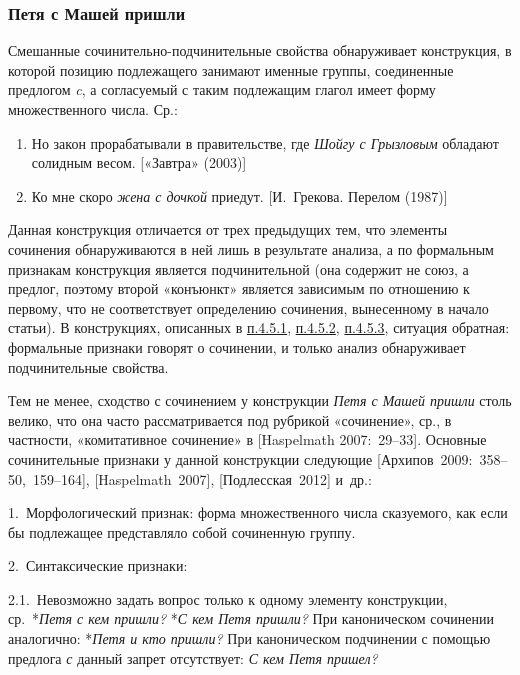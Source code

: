\subsubsection{Петя с Машей
пришли}\label{ux43fux435ux442ux44f-ux441-ux43cux430ux448ux435ux439-ux43fux440ux438ux448ux43bux438}

Смешанные сочинительно-подчинительные свойства обнаруживает конструкция,
в которой позицию подлежащего занимают именные группы, соединенные
предлогом \textit{c}, а согласуемый с таким подлежащим глагол имеет форму
множественного числа. Ср.:

\begin{enumerate}
\def\labelenumi{(\arabic{enumi})}
\setcounter{enumi}{62}
\item
  Но закон прорабатывали в правительстве, где \textit{Шойгу с Грызловым}
  обладают солидным весом. {[}«Завтра» (2003){]}
\item
  Ко мне скоро \textit{жена с дочкой} приедут. {[}И.~Грекова. Перелом
  (1987){]}
\end{enumerate}

Данная конструкция отличается от трех предыдущих тем, что элементы
сочинения обнаруживаются в ней лишь в результате анализа, а по
формальным признакам конструкция является подчинительной (она содержит
не союз, а предлог, поэтому второй «конъюнкт» является зависимым по
отношению к первому, что не соответствует определению сочинения,
вынесенному в начало статьи). В конструкциях, описанных в
\underline{п.4.5.1}, \underline{п.4.5.2}, \underline{п.4.5.3}, ситуация
обратная: формальные признаки говорят о сочинении, и только анализ
обнаруживает подчинительные свойства.

Тем не менее, сходство с сочинением у конструкции \textit{Петя с Машей
пришли} столь велико, что она часто рассматривается под рубрикой
«сочинение», ср., в частности, «комитативное сочинение» в {[}Haspelmath
2007:~29--33{]}. Основные сочинительные признаки у данной конструкции
следующие {[}Архипов~2009:~358--50,~159--164{]}, {[}Haspelmath~2007{]},
{[}Подлесская~2012{]} и~др.:

1.~Морфологический признак: форма множественного числа сказуемого, как
если бы подлежащее представляло собой сочиненную группу.

2.~Синтаксические признаки:

2.1.~Невозможно задать вопрос только к одному элементу конструкции,
ср.~*\textit{Петя с кем пришли?} *\textit{С кем Петя пришли?} При
каноническом сочинении аналогично: *\textit{Петя и кто пришли?} При
каноническом подчинении с помощью предлога \textit{с} данный запрет
отсутствует: \textit{С кем Петя пришел?}

